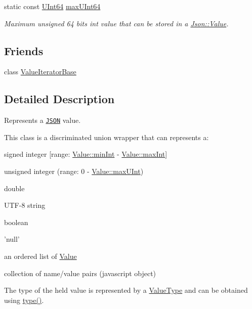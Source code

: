 \begin{DoxyCompactItemize}
static const \hyperlink{class_json_1_1_value_a8b62564be8c087c6d18de180ff4e13e3}{U\-Int64} \hyperlink{class_json_1_1_value_ae1eb89c305c39516696ff305cffa01da}{max\-U\-Int64}
\begin{DoxyCompactList}\small\item\em Maximum unsigned 64 bits int value that can be stored in a \hyperlink{class_json_1_1_value}{Json\-::\-Value}. \end{DoxyCompactList}\end{DoxyCompactItemize}
\subsection*{Friends}
\begin{DoxyCompactItemize}
\item 
class \hyperlink{class_json_1_1_value_ad016df56489e5d360735457afba2f649}{Value\-Iterator\-Base}
\end{DoxyCompactItemize}


\subsection{Detailed Description}
Represents a \href{http://www.json.org}{\tt J\-S\-O\-N} value. 

This class is a discriminated union wrapper that can represents a\-:
\begin{DoxyItemize}
\item signed integer \mbox{[}range\-: \hyperlink{class_json_1_1_value_a7df8a39e2502b8c92a6a41e3d752d2c8}{Value\-::min\-Int} -\/ \hyperlink{class_json_1_1_value_a978c799a8af3114ef7dab6fd0a310a1b}{Value\-::max\-Int}\mbox{]}
\item unsigned integer (range\-: 0 -\/ \hyperlink{class_json_1_1_value_ac79e63ee68d3aa914bfd6988be669b87}{Value\-::max\-U\-Int})
\item double
\item U\-T\-F-\/8 string
\item boolean
\item 'null'
\item an ordered list of \hyperlink{class_json_1_1_value}{Value}
\item collection of name/value pairs (javascript object)
\end{DoxyItemize}

The type of the held value is represented by a \hyperlink{namespace_json_a7d654b75c16a57007925868e38212b4e}{Value\-Type} and can be obtained using \hyperlink{class_json_1_1_value_a695ef31fad36b4712918b3ff80158479}{type()}.

